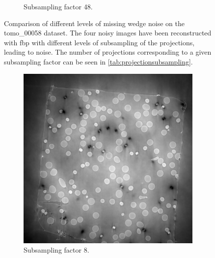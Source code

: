\begin{figure}
\begin{subfigure}[t]{.45\textwidth}
    \caption{Subsampling factor 48. }
  \end{subfigure}
  \caption[Four different levels of missing wedge noise]{Comparison of different levels of missing wedge noise on the tomo\_00058 dataset. The four noisy images have been reconstructed with \acrshort{fbp} with different levels of subsampling of the projections, leading to noise. The number of projections corresponding to a given subsampling factor can be seen in \cref{tab:projectionsubsampling}. }
  \label{fig:tomo00058missingwedgecomparison}
\end{figure}


\begin{figure}
  \begin{subfigure}[t]{.45\textwidth}
    \centering
    \includegraphics[width=\linewidth]{figures/ns8it100000itd4mse035logcosh3.png}
    \caption{Subsampling factor 8. }
  \end{subfigure}
  \hfill
  \begin{subfigure}[t]{.45\textwidth}
    \centering

\end{subfigure}
\end{figure}
